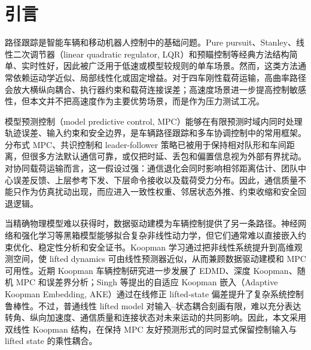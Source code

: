 \documentclass[twocolumn,3p,times,procedia]{elsarticle}
\newif\ifNRReview
\newcommand{\reviewblock}[1]{\ifNRReview\par\smallskip\noindent\begingroup\setlength{\fboxsep}{4pt}\colorbox{yellow!35}{\parbox{0.96\linewidth}{\footnotesize\textbf{当前不足：} #1}}\endgroup\par\smallskip\fi}
\newcommand{\AKE}{AKE-M}
\begin{document}
\reviewblock{回头弯同初始条件面板中，高曲率抗扰分支的团队中心横向 RMSE 降至 0.0851 m、峰值降至 0.1804 m，满足 0.2 m 内的峰值目标；但最终货物保护版本为了降低合力会牺牲部分横向误差，不能写成“全过程严格小于基线”。15 m/s 正弦已由进度过强版本更新为局部平衡版本，可跑完整且横向 RMSE 从 0.1586 m 降至 0.1574 m、纵向 RMSE 从 0.8857 m 降至 0.8815 m；但最大逐点正 gap 仍为 0.0041 m，因此只能写作 RMSE/峰值改善，不能写作全过程严格逐点优于基线。载荷力峰值在若干场景中高于 \AKE{}，因此受力指标仍应作为代价审计项。}


\section{引言}

路径跟踪是智能车辆和移动机器人控制中的基础问题。Pure pursuit、Stanley、线性二次调节器（linear quadratic regulator, LQR）和预瞄控制等经典方法结构简单、实时性好，因此被广泛用于低速或模型较规则的单车场景。然而，这类方法通常依赖运动学近似、局部线性化或固定增益。对于四车刚性载荷运输，高曲率路径会放大横纵向耦合、执行器约束和载荷连接误差；高速度场景进一步提高控制敏感性，但本文并不把高速度作为主要优势场景，而是作为压力测试工况。

模型预测控制（model predictive control, MPC）能够在有限预测时域内同时处理轨迹误差、输入约束和安全边界，是车辆路径跟踪和多车协调控制中的常用框架。分布式 MPC、共识控制和 leader-follower 策略已被用于保持相对队形和车间距离，但很多方法默认通信可靠，或仅把时延、丢包和偏置信息视为外部有界扰动。对协同载荷运输而言，这一假设过强：通信退化会同时影响相邻距离估计、团队中心误差反馈、上层参考下发、下层命令接收以及载荷受力分布。因此，通信质量不能只作为仿真扰动出现，而应进入一致性权重、邻居状态外推、约束收缩和安全回退逻辑。

当精确物理模型难以获得时，数据驱动建模为车辆控制提供了另一条路径。神经网络和强化学习等黑箱模型能够拟合复杂非线性动力学，但它们通常难以直接嵌入约束优化、稳定性分析和安全证书。Koopman 学习通过把非线性系统提升到高维观测空间，使 lifted dynamics 可由线性预测器近似，从而兼顾数据驱动建模和 MPC 可用性\cite{brunton2016koopmanControl,korda2018koopmanMpc}。近期 Koopman 车辆控制研究进一步发展了 EDMD、深度 Koopman、随机 MPC 和误差界分析\cite{kim2025ksmpc,chen2024esoDeepKoopman,philipp2023koopmanErrorBounds,cibulka2021koopmanVehicleMpc}；Singh 等提出的自适应 Koopman 嵌入（Adaptive Koopman Embedding, AKE）通过在线修正 lifted-state 偏差提升了复杂系统控制鲁棒性\cite{singh2025adaptiveKoopman}。不过，普通线性 lifted model 对输入--状态耦合刻画有限，难以充分表达转角、纵向加速度、通信质量和连接状态对未来运动的共同影响。因此，本文采用双线性 Koopman 结构，在保持 MPC 友好预测形式的同时显式保留控制输入与 lifted state 的乘性耦合。
\end{document}
